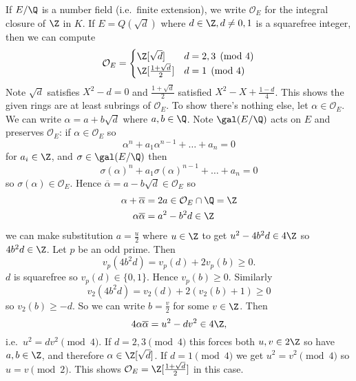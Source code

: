 \documentclass[a4paper]{article}
\renewcommand*{\O}{\mathcal{O}}
\begin{document}
\begin{eg}
  If \(E/\Q\) is a number field (i.e.\ finite extension), we write \(\O_E\) for the integral closure of \(\Z\) in \(K\). If \(E = Q(\sqrt d)\) where \(d \in \Z, d \neq 0, 1\) is a squarefree integer, then we can compute
  \[
    \O_E =
    \begin{cases}
      \Z[\sqrt d] & d = 2, 3 \pmod 4 \\
      \Z[\frac{1 + \sqrt d}{2}] & d = 1 \pmod 4
    \end{cases}
  \]
  Note \(\sqrt d\) satisfies \(X^2 - d = 0\) and \(\frac{1 + \sqrt d}{2}\) satisfied \(X^2 - X + \frac{1 - d}{4}\). This shows the given rings are at least subrings of \(\O_E\). To show there's nothing else, let \(\alpha \in \O_E\). We can write \(\alpha = a + b \sqrt d\) where \(a, b \in \Q\). Note \(\gal(E/\Q)\) acts on \(E\) and preserves \(\O_E\): if \(\alpha \in \O_E\) so
  \[
    \alpha^n + a_1 \alpha^{n - 1} + \dots + a_n = 0
  \]
  for \(a_i \in \Z\), and \(\sigma \in \gal(E/\Q)\) then
  \[
    \sigma(\alpha)^n + a_1 \sigma(\alpha)^{n - 1} + \dots + a_n = 0
  \]
  so \(\sigma(\alpha) \in \O_E\). Hence \(\overline \alpha = a - b\sqrt d \in \O_E\) so
  \begin{align*}
    \alpha + \overline \alpha &= 2a \in \O_E \cap \Q = \Z \\
    \alpha \overline \alpha &= a^2 - b^2d \in \Z
  \end{align*}
  we can make substitution \(a = \frac{u}{2}\) where \(u \in \Z\) to get \(u^2 - 4b^2d \in 4\Z\) so \(4b^2d \in \Z\). Let \(p\) be an odd prime. Then
  \[
    v_p(4b^2d) = v_p(d) + 2v_p(b) \geq 0.
  \]
  \(d\) is squarefree so \(v_p(d) \in \{0, 1\}\). Hence \(v_p(b) \geq 0\). Similarly
  \[
    v_2(4b^2d) = v_2(d) + 2(v_2(b) + 1) \geq 0
  \]
  so \(v_2(b) \geq -d\). So we can write \(b = \frac{v}{2}\) for some \(v \in \Z\). Then
  \[
    4 \alpha \overline \alpha = u^2 - dv^2 \in 4\Z,
  \]
  i.e.\ \(u^2 = dv^2 \pmod 4\). If \(d = 2, 3 \pmod 4\) this forces both \(u, v \in 2\Z\) so have \(a, b \in \Z\), and therefore \(\alpha \in \Z[\sqrt d]\). If \(d = 1 \pmod 4\) we get \(u^2 = v^2 \pmod 4\) so \(u = v \pmod 2\). This shows \(\O_E = \Z[\frac{1 + \sqrt d}{2}]\) in this case.


\end{eg}
\end{document}
